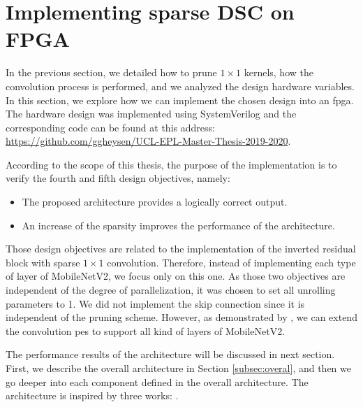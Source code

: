 \section{Implementing sparse DSC on FPGA} \label{sec:implementation}
In the previous section, we detailed how to prune $1 \times 1$ kernels, how the convolution process is performed, and we analyzed the design hardware variables. In this section, we explore how we can implement the chosen design into an \acrshort{fpga}. The hardware design was implemented using SystemVerilog and the corresponding code can be found at this address: \url{https://github.com/ggheysen/UCL-EPL-Master-Thesis-2019-2020}.

According to the scope of this thesis, the purpose of the implementation is to verify the fourth and fifth design objectives, namely:
%
\begin{itemize}
    \item The proposed architecture provides a logically correct output.
    \item An increase of the sparsity improves the performance of the architecture.
\end{itemize}
%
Those design objectives are related to the implementation of the inverted residual block with sparse $1 \times 1$ convolution. Therefore, instead of implementing each type of layer of MobileNetV2, we focus only on this one. As those two objectives are independent of the degree of parallelization, it was chosen to set all unrolling parameters to 1. We did not implement the skip connection since it is independent of the pruning scheme. However, as demonstrated by \textcite{bai_cnn_2018, liu_fpga-based_2019}, we can extend the convolution \acrshort{pe}s to support all kind of layers of MobileNetV2.

The performance results of the architecture will be discussed in next section. First, we describe the overall architecture in Section \ref{subsec:overal}, and then we go deeper into each component defined in the overall architecture. The architecture is inspired by three works: \textcite{zhu_efficient_2020, kang_accelerator-aware_2020, bai_cnn_2018}.
%
